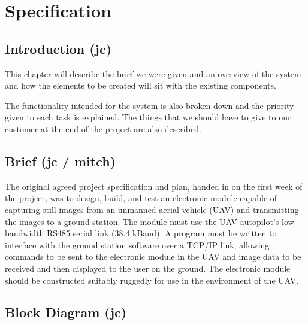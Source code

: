 \chapter{Specification}
\label{chap:specification}

\section{Introduction (jc)}

This chapter will describe the brief we were given and an overview of the system and how the elements to be created will sit with the existing components.

The functionality intended for the system is also broken down and the priority given to each task is explained. The things that we should have to give to our customer at the end of the project are also described.

\section{Brief (jc / mitch)}

The original agreed project specification and plan, handed in on the first week of the project, was to design, build, and test an electronic module capable of capturing still images from an unmanned aerial vehicle (UAV) and transmitting the images to a ground station. The module must use the UAV autopilot’s low-bandwidth RS485 serial link (38.4 kBaud). A program must be written to interface with the ground station software over a TCP/IP link, allowing commands to be sent to the electronic module in the UAV and image data to be received and then displayed to the user on the ground. The electronic module should be constructed suitably ruggedly for use in the environment of the UAV.

\section{Block Diagram (jc)}

